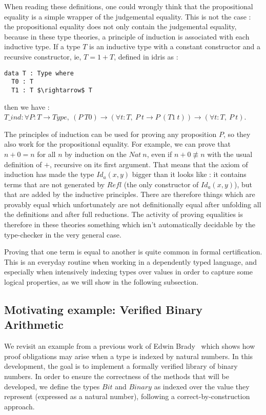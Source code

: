 When reading these definitions, one could wrongly think that the propositional equality is a simple wrapper of the judgemental equality. This is not the case : the propositional equality does not only contain the judgemental equality, because in these type theories, a principle of induction is associated with each inductive type. If a type $T$ is an inductive type with a constant constructor and a recursive constructor, ie, $T = 1 + T$, defined in idris as : 

\begin{lstlisting}
data T : Type where
  T0 : T
  T1 : T $\rightarrow$ T          
\end{lstlisting}

then we have : \\
$T\_ind : \forall P:T \rightarrow Type,\ (P\ T0) \rightarrow (\forall t:T,\ P\ t \rightarrow P\ (T1\ t)) \rightarrow (\forall t:T,\ P\ t)$.

The principles of induction can be used for proving any proposition $P$, so they also work for the propositional equality. For example, we can prove that $n+0 = n$ for all $n$ by induction on the $Nat\ n$, even if $n+0 \not\equiv n$ with the usual definition of $+$, recursive on its first argument. That means that the axiom of induction has made the type $Id_{a}(x,y)$ bigger than it looks like : it contains terms that are not generated by $Refl$ (the only constructor of $Id_{a}(x,y)$), but that are added by the inductive principles. There are therefore things which are provably equal which unfortunately are not definitionally equal after unfolding all the definitions and after full reductions. The activity of proving equalities is therefore in these theories something which isn't automatically decidable by the type-checker in the very general case.

Proving that one term is equal to another is quite common
in formal certification. This is an everyday routine when working in a dependently typed language, and especially when intensively indexing types over values in order to capture some logical properties, as we will show in the following subsection.

\subsection{Motivating example: Verified Binary Arithmetic}
\label{sect:motivatingExample}

We revisit an example from a previous work of Edwin Brady~\cite{bradytfp07} which shows how proof obligations may arise when a type is indexed by natural numbers. In this development, the goal is to implement a formally verified library of binary numbers. In order to ensure the correctness of the methods that will be developed, we define the types $Bit$ and $Binary$ as indexed over the value they represent (expressed as a natural number), following a correct-by-construction approach.

